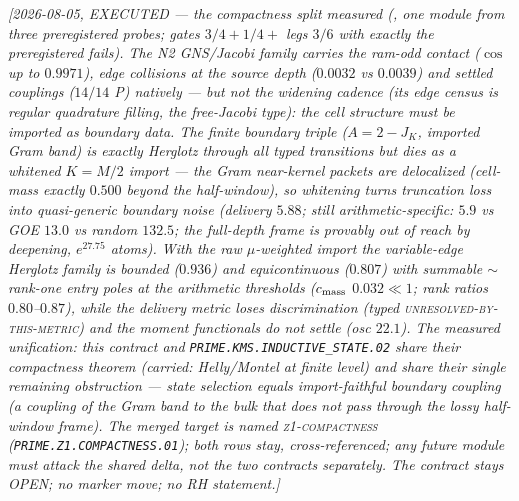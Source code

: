 \emph{[2026-08-05, EXECUTED --- the compactness split measured
(, one module from three
preregistered probes; gates $3/4+1/4+$ legs $3/6$ with exactly the
preregistered fails).  The N2 GNS/Jacobi family carries the
ram-odd contact ($\cos$ up to $0.9971$), edge collisions at the
source depth ($0.0032$ vs $0.0039$) and settled couplings
($14/14$ P) natively --- but \emph{not} the widening cadence (its
edge census is regular quadrature filling, the free-Jacobi type):
the cell structure must be imported as boundary data.  The finite
boundary triple ($A=2-J_K$, imported Gram band) is \emph{exactly}
Herglotz through all typed transitions but dies as a whitened
$K=M/2$ import --- the Gram near-kernel packets are delocalized
(cell-mass exactly $0.500$ beyond the half-window), so whitening
turns truncation loss into quasi-generic boundary noise (delivery
$5.88$; still arithmetic-specific: $5.9$ vs GOE $13.0$ vs random
$132.5$; the full-depth frame is provably out of reach by
deepening, $e^{27.75}$ atoms).  With the \emph{raw} $\mu$-weighted
import the variable-edge Herglotz family is \emph{bounded}
($0.936$) and \emph{equicontinuous} ($0.807$) with \emph{summable}
${\sim}$rank-one entry poles at the arithmetic thresholds
($c_{\rm mass}$ $0.032\ll1$; rank ratios $0.80$--$0.87$), while
the delivery metric loses discrimination (typed
\textsc{unresolved-by-this-metric}) and the moment functionals do
not settle (osc $22.1$).  \emph{The measured unification:} this
contract and \texttt{PRIME.KMS.INDUCTIVE\_STATE.02} \emph{share}
their compactness theorem (carried: Helly/Montel at finite level)
and \emph{share} their single remaining obstruction --- state
selection \emph{equals} import-faithful boundary coupling (a
coupling of the Gram band to the bulk that does not pass through
the lossy half-window frame).  The merged target is named
\textsc{z1-compactness} (\texttt{PRIME.Z1.COMPACTNESS.01}); both
rows stay, cross-referenced; any future module must attack the
shared delta, not the two contracts separately.  The contract
stays OPEN; no marker move; no RH statement.]}


